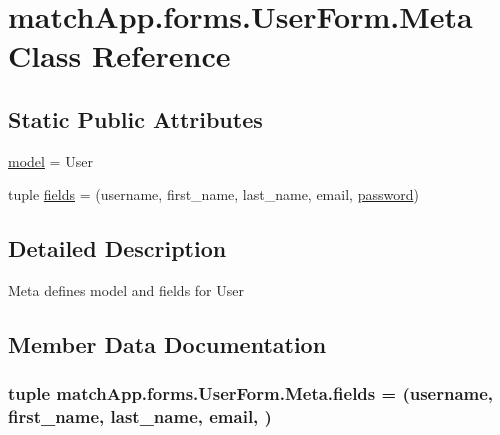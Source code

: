 \hypertarget{classmatch_app_1_1forms_1_1_user_form_1_1_meta}{}\section{match\+App.\+forms.\+User\+Form.\+Meta Class Reference}
\label{classmatch_app_1_1forms_1_1_user_form_1_1_meta}
\subsection*{Static Public Attributes}
\begin{DoxyCompactItemize}
\item 
\hyperlink{classmatch_app_1_1forms_1_1_user_form_1_1_meta_a5d9648ab073e418b0cfa6b4883c32423}{model} = User
\item 
tuple \hyperlink{classmatch_app_1_1forms_1_1_user_form_1_1_meta_afe2afbc82f901ad4b2f8c4df86bc3216}{fields} = (\textquotesingle{}username\textquotesingle{}, \textquotesingle{}first\+\_\+name\textquotesingle{}, \textquotesingle{}last\+\_\+name\textquotesingle{}, \textquotesingle{}email\textquotesingle{}, \textquotesingle{}\hyperlink{classmatch_app_1_1forms_1_1_user_form_a22fba20516b0361b6db1a96fc08c5053}{password}\textquotesingle{})
\end{DoxyCompactItemize}


\subsection{Detailed Description}
\begin{DoxyVerb}Meta defines model and fields for User\end{DoxyVerb}
 

\subsection{Member Data Documentation}
\hypertarget{classmatch_app_1_1forms_1_1_user_form_1_1_meta_afe2afbc82f901ad4b2f8c4df86bc3216}{}
\subsubsection[{fields}]{\setlength{\rightskip}{0pt plus 5cm}tuple match\+App.\+forms.\+User\+Form.\+Meta.\+fields = (\textquotesingle{}username\textquotesingle{}, \textquotesingle{}first\+\_\+name\textquotesingle{}, \textquotesingle{}last\+\_\+name\textquotesingle{}, \textquotesingle{}email\textquotesingle{}, \textquotesingle{})\hspace{0.3cm}{\ttfamily [static]}}\label{classmatch_app_1_1forms_1_1_user_form_1_1_meta_afe2afbc82f901ad4b2f8c4df86bc3216}
\hypertarget{classmatch_app_1_1forms_1_1_user_form_1_1_meta_a5d9648ab073e418b0cfa6b4883c32423}{}

